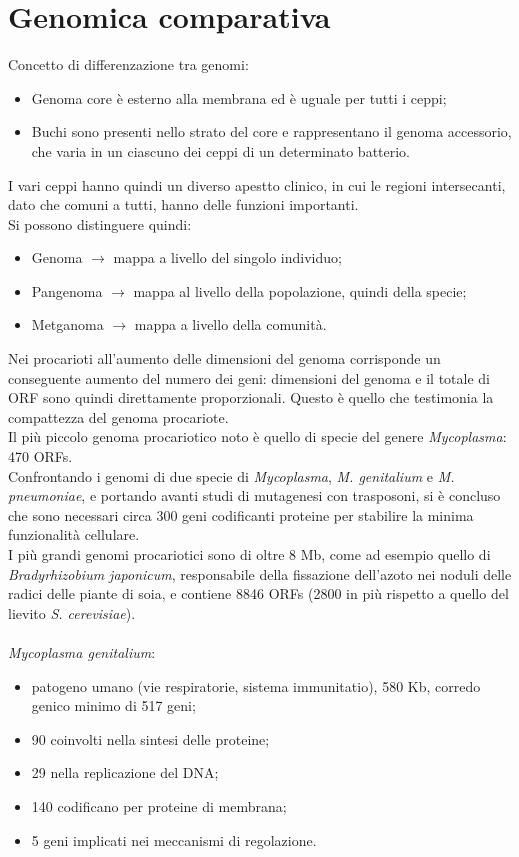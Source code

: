 \section{Genomica comparativa}
Concetto di differenzazione tra genomi:
\begin{itemize}
    \item Genoma core \`e esterno alla membrana ed \`e uguale per tutti i ceppi;
    \item Buchi sono presenti nello strato del core e rappresentano il genoma accessorio, che varia in un ciascuno dei ceppi di un determinato batterio.
\end{itemize}
I vari ceppi hanno quindi un diverso apestto clinico, in cui le regioni intersecanti, dato che comuni a tutti, hanno delle funzioni importanti. 
\\Si possono distinguere quindi: 
\begin{itemize}
    \item Genoma $\xrightarrow{}$ mappa a livello del singolo individuo;
    \item Pangenoma $\xrightarrow{}$ mappa al livello della popolazione, quindi della specie;
    \item Metganoma $\xrightarrow{}$ mappa a livello della comunit\`a.
\end{itemize}
Nei procarioti all'aumento delle dimensioni del genoma corrisponde un conseguente aumento del numero dei geni: dimensioni del genoma e il totale di ORF sono quindi direttamente proporzionali. Questo \`e quello che testimonia la compattezza del genoma procariote.
\\Il pi\`u piccolo genoma procariotico noto \`e quello di specie del genere \textit{Mycoplasma}: 470 ORFs.
\\Confrontando i genomi di due specie di \textit{Mycoplasma}, \textit{M. genitalium} e \textit{M. pneumoniae}, e portando avanti studi di mutagenesi con trasposoni, si \`e concluso che sono necessari circa 300 geni codificanti proteine per stabilire la minima funzionalit\`a cellulare. 
\\I pi\`u grandi genomi procariotici sono di oltre 8 Mb, come ad esempio quello di \textit{Bradyrhizobium japonicum}, responsabile della fissazione dell'azoto nei noduli delle radici delle piante di soia, e contiene 8846 ORFs (2800 in pi\`u rispetto a quello del lievito \textit{S. cerevisiae}).
\\\\\textit{Mycoplasma genitalium}:
\begin{itemize}
    \item patogeno umano (vie respiratorie, sistema immunitatio), 580 Kb, corredo genico minimo di 517 geni;
    \item 90 coinvolti nella sintesi delle proteine;
    \item 29 nella replicazione del DNA; 
    \item 140 codificano per proteine di membrana; 
    \item 5 geni implicati nei meccanismi di regolazione.
\end{itemize}

